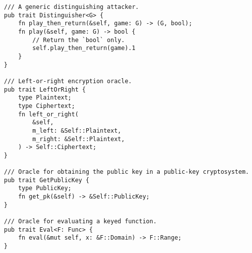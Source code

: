\documentclass{article}
\begin{document}
\begin{lstlisting}
/// A generic distinguishing attacker.
pub trait Distinguisher<G> {
    fn play_then_return(&self, game: G) -> (G, bool);
    fn play(&self, game: G) -> bool {
        // Return the `bool` only.
        self.play_then_return(game).1
    }
}

/// Left-or-right encryption oracle.
pub trait LeftOrRight {
    type Plaintext;
    type Ciphertext;
    fn left_or_right(
        &self,
        m_left: &Self::Plaintext,
        m_right: &Self::Plaintext,
    ) -> Self::Ciphertext;
}

/// Oracle for obtaining the public key in a public-key cryptosystem.
pub trait GetPublicKey {
    type PublicKey;
    fn get_pk(&self) -> &Self::PublicKey;
}

/// Oracle for evaluating a keyed function.
pub trait Eval<F: Func> {
    fn eval(&mut self, x: &F::Domain) -> F::Range;
}
\end{lstlisting}
\end{document}
